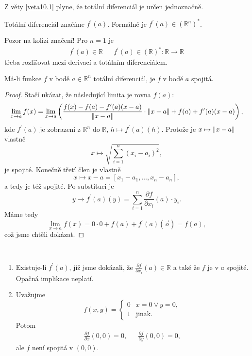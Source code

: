 \begin{poznamka}
	Z věty \ref{veta10.1} plyne, že totální diferenciál je určen jednoznačně.
\end{poznamka}

\begin{oznaceni}
	Totální diferenciál značíme $f^\prime(a)$. Formálně je $f^\prime(a)\in \left( \mathbb R ^n \right )^* $.
	\par Pozor na kolizi značení! Pro $n=1$ je
	\begin{align*}
		f^\prime(a)\in \mathbb R && f^\prime(a) \in (\mathbb R)^* : \mathbb R \to \mathbb R
	\end{align*}
	třeba rozlišovat mezi derivací a totálním diferenciálem.
\end{oznaceni}

\begin{veta}\label{veta10.2}
Má-li funkce $f$ v bodě
$a\in\mathbb{R}^n$
totální diferenciál, je
$f$ v bodě $a$ spojitá.
\end{veta}

\begin{proof}
    Stačí ukázat, že následující limita je rovna $f(a)$:
    $$
    \lim_{x \to a } f(x) = \lim_{x \to a }  \left (\frac{f(x)-f(a)-f^\prime(a)(x-a) }{\lVert x-a \rVert} \cdot \lVert x-a \rVert + f(a) + f^\prime(a)(x-a)\right ),
    $$
    kde $f^\prime(a)$ je zobrazení z $\mathbb R ^n$ do $\mathbb R $, $h \mapsto f^\prime(a)(h)$.
    Protože je $x \mapsto \lVert x-a \rVert$ vlastně
    $$x \mapsto \sqrt{\sum_{i=1}^n (x_i-a_i)^2},$$ je spojité.
    Konečně třetí člen je vlastně $$x \mapsto x-a = [x_1-a_1, \dots, x_n-a_n],$$ a tedy je též spojité.
    Po substituci je $$y \to f^\prime(a)(y) = \sum_{i=1}^n \frac{\partial f }{\partial x_i}(a)\cdot y_i.$$
    Máme tedy
    $$
    \lim_{x \to a } f(x) = 0\cdot 0 + f(a) + f^\prime(a) (\vec o) = f(a),
    $$
    což jsme chtěli dokázat.
\end{proof}

\begin{poznamka}
	\,
	\begin{enumerate}[(1)]
		\item Existuje-li $f^\prime(a)$, již jsme dokázali, že $\frac{\partial f }{\partial x_i}(a)\in \mathbb R $
		a také že $f$ je v $a$ spojité. Opačná implikace neplatí.
		\item Uvažujme
		$$
		    f(x,y) = \begin{cases}
							0 & x=0 \lor y=0, \\
							1 & \text{jinak}.
						\end{cases}
		$$
		Potom
		\begin{align*}
		\frac{\partial f }{\partial x }(0,0) = 0, & & \frac{\partial f }{\partial y}(0,0) = 0,
\end{align*}
ale $f$ není spojitá v $(0,0)$.
	\end{enumerate}
\end{poznamka}

